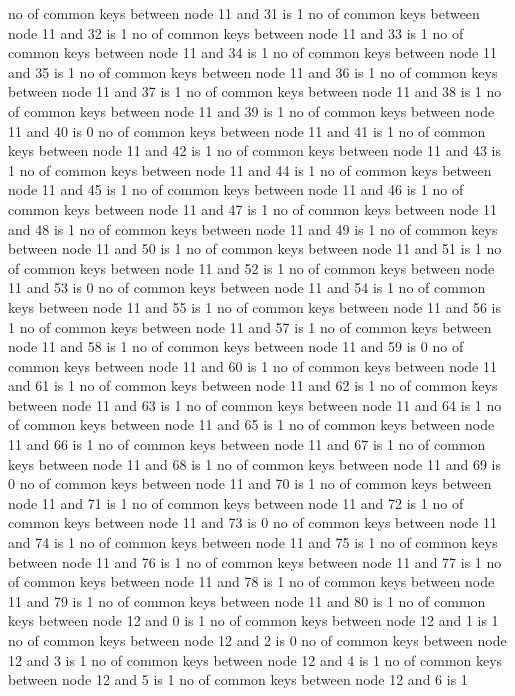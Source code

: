 no of common keys between node 11 and 31 is 1
no of common keys between node 11 and 32 is 1
no of common keys between node 11 and 33 is 1
no of common keys between node 11 and 34 is 1
no of common keys between node 11 and 35 is 1
no of common keys between node 11 and 36 is 1
no of common keys between node 11 and 37 is 1
no of common keys between node 11 and 38 is 1
no of common keys between node 11 and 39 is 1
no of common keys between node 11 and 40 is 0
no of common keys between node 11 and 41 is 1
no of common keys between node 11 and 42 is 1
no of common keys between node 11 and 43 is 1
no of common keys between node 11 and 44 is 1
no of common keys between node 11 and 45 is 1
no of common keys between node 11 and 46 is 1
no of common keys between node 11 and 47 is 1
no of common keys between node 11 and 48 is 1
no of common keys between node 11 and 49 is 1
no of common keys between node 11 and 50 is 1
no of common keys between node 11 and 51 is 1
no of common keys between node 11 and 52 is 1
no of common keys between node 11 and 53 is 0
no of common keys between node 11 and 54 is 1
no of common keys between node 11 and 55 is 1
no of common keys between node 11 and 56 is 1
no of common keys between node 11 and 57 is 1
no of common keys between node 11 and 58 is 1
no of common keys between node 11 and 59 is 0
no of common keys between node 11 and 60 is 1
no of common keys between node 11 and 61 is 1
no of common keys between node 11 and 62 is 1
no of common keys between node 11 and 63 is 1
no of common keys between node 11 and 64 is 1
no of common keys between node 11 and 65 is 1
no of common keys between node 11 and 66 is 1
no of common keys between node 11 and 67 is 1
no of common keys between node 11 and 68 is 1
no of common keys between node 11 and 69 is 0
no of common keys between node 11 and 70 is 1
no of common keys between node 11 and 71 is 1
no of common keys between node 11 and 72 is 1
no of common keys between node 11 and 73 is 0
no of common keys between node 11 and 74 is 1
no of common keys between node 11 and 75 is 1
no of common keys between node 11 and 76 is 1
no of common keys between node 11 and 77 is 1
no of common keys between node 11 and 78 is 1
no of common keys between node 11 and 79 is 1
no of common keys between node 11 and 80 is 1
no of common keys between node 12 and 0 is 1
no of common keys between node 12 and 1 is 1
no of common keys between node 12 and 2 is 0
no of common keys between node 12 and 3 is 1
no of common keys between node 12 and 4 is 1
no of common keys between node 12 and 5 is 1
no of common keys between node 12 and 6 is 1
